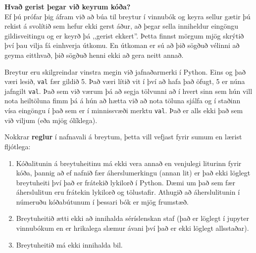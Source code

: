 \begin{itarefni}
\textbf{Hvað gerist þegar við keyrum kóða?}\\
Ef þú prófar þig áfram við að búa til breytur í vinnubók og keyra sellur gætir þú rekist á svolítið sem hefur ekki gerst áður, að þegar sella inniheldur eingöngu gildisveitingu og er keyrð þá ,,gerist ekkert''.
Þetta finnst mörgum mjög skrýtið því þau vilja fá einhverja útkomu.
En útkoman er sú að þið sögðuð vélinni að geyma eitthvað, þið sögðuð henni ekki að gera neitt annað.	
\end{itarefni}

Breytur eru skilgreindar vinstra megin við jafnaðarmerki í Python.
Eins og það væri lesið, \texttt{val} fær gildið 5.
Það væri lítið vit í því að hafa það öfugt, 5 er núna jafngilt \texttt{val}.
Það sem við værum þá að segja tölvunni að í hvert sinn sem hún vill nota heiltöluna fimm þá á hún að hætta við að nota töluna sjálfa og í staðinn vísa eingöngu í það sem er í minnissvæði merktu \texttt{val}.
Það er alls ekki það sem við viljum (eða mjög ólíklega).

\vspace{0.1cm}

Nokkrar \textbf{reglur} í nafnavali á breytum, þetta vill vefjast fyrir sumum en lærist fljótlega:
\vspace{0.1cm}
\begin{enumerate}
	\item Kóðalitunin á breytuheitinu má ekki vera annað en venjulegi liturinn fyrir kóða, þannig að ef nafnið fær áherslumerkingu (annan lit) er það ekki löglegt breytuheiti því það er frátekið lykilorð í Python. 
	Dæmi um það sem fær áherslulitun eru frátekin lykilorð og tölustafir.
	Athugið að áherslulitunin í númeruðu kóðabútunum í þessari bók er mjög frumstæð.
	\item Breytuheitið ætti ekki að innihalda séríslenskan staf (það er löglegt í jupyter vinnubókum en er hrikalega slæmur ávani því það er ekki löglegt allsstaðar).
	\item Breytuheitið má ekki innihalda bil.
\end{enumerate}
\vspace{0.1cm}

